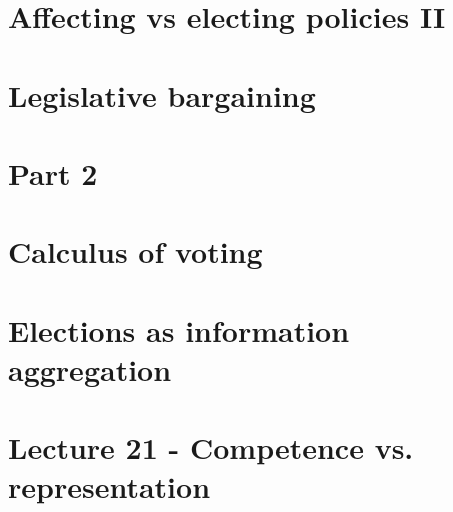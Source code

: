 \documentclass{01_preamble/report}
\numberwithin{equation}{section}
\begin{document}
\section{Affecting vs electing policies II}


\section{Legislative bargaining}


\pagebreak
\section*{Part 2}
\section{Calculus of voting}


\section{Elections as information aggregation}


\pagebreak
\section{Lecture 21 - Competence vs. representation}

\newpage

\end{document}
